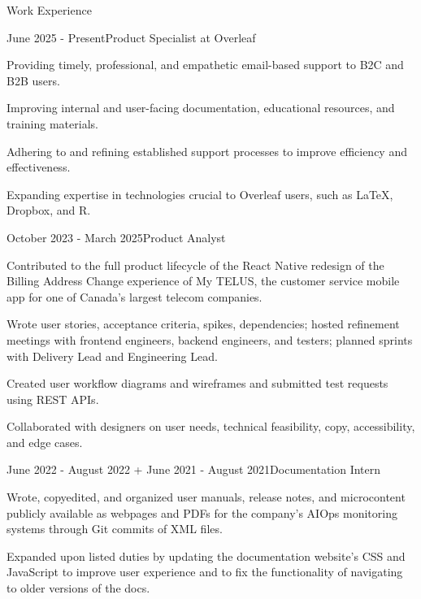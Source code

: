 \documentclass[11pt]{resume} %
\begin{document}
\begin{rSection}{\large Work Experience}

	\begin{rSubsection}{\underline{}}{June 2025 - Present}{Product Specialist at Overleaf}{}\small
		\item Providing timely, professional, and empathetic email-based support to B2C and B2B users.
		\item Improving internal and user-facing documentation, educational resources, and training materials.
		\item Adhering to and refining established support processes to improve efficiency and effectiveness.
		\item Expanding expertise in technologies crucial to Overleaf users, such as \LaTeX, Dropbox, and R.
	\end{rSubsection}


	\begin{rSubsection}{\underline{}}{October 2023 - March 2025}{Product Analyst}{}\small
		\item Contributed to the full product lifecycle of the React Native redesign of the Billing Address Change experience of My TELUS, the customer service mobile app for one of Canada’s largest telecom companies.
		\item Wrote user stories, acceptance criteria, spikes, dependencies; hosted refinement meetings with frontend engineers, backend engineers, and testers; planned sprints with Delivery Lead and Engineering Lead.
		\item Created user workflow diagrams and wireframes and submitted test requests using REST APIs.
            \item Collaborated with designers on user needs, technical feasibility, copy, accessibility, and edge cases.
	\end{rSubsection}


	\begin{rSubsection}{\underline{}}{June 2022 - August 2022 + June 2021 - August 2021}{Documentation Intern}{}\small
		\item Wrote, copyedited, and organized user manuals, release notes, and microcontent publicly available as webpages and PDFs for the company's AIOps monitoring systems through Git commits of XML files.
		\item Expanded upon listed duties by updating the documentation website’s CSS and JavaScript to improve user experience and to fix the functionality of navigating to older versions of the docs.
	\end{rSubsection}


\end{rSection}
\end{document}
